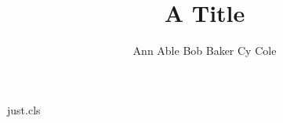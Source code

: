 \begin{filecontents*}[overwrite]{just.cls}
\setcounter{email}{1}
\newcommand{\email}[1]{\protected@xdef\@thanks{\@thanks
  \protect\footnotetext[0]{\hspace*{-8pt}\arabic{email})\,{E-mail:\,}#1}}\stepcounter{email}}
\newcommand{\emails}[1]{\footnotetext[0]{\hspace*{-8pt}\arabic{email})\,{E-mail:\,}#1}\stepcounter{email}}
\renewcommand\maketitle{\par\begingroup\newpage\@maketitle\@thanks\endgroup
  \setcounter{footnote}{0}\global\let\thanks\relax\global\let\maketitle\relax
  \global\let\@maketitle\relax\global\let\@thanks\@empty\global\let\@author\@empty\global\let\@title\@empty}
\renewcommand\@maketitle{\begin{center}\let\footnote\thanks{\Large\bf\@title\par}%
  {\normalsize\lineskip .5em\vskip 4mm\begin{tabular}[t]{c}\normalsize\@author\end{tabular}}\end{center}}
\newcommand{\address}[1]{\vspace*{0mm}
  \begin{center}\vskip -5mm\begin{center}{\footnotesize #1}\end{center}\end{center}}
\end{filecontents*}
\documentclass{just}

\title{A Title}
\author{Ann Able \quad Bob Baker \quad Cy Cole}
\maketitle
\address{Center for Theory, Univ A, Town, Country}
Body.

